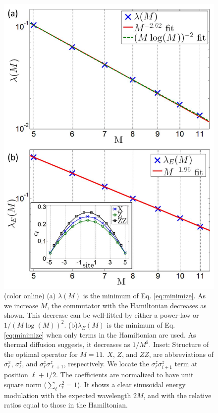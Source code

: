 \documentclass[twocolumn,superscriptaddress, prl,showpacs]{revtex4-1}
\begin{document}
\begin{figure}
\includegraphics[width=0.95\linewidth]{fig_hamiltonian.pdf}
\centering
\caption{(color online) (a) $\lambda(M)$ is the minimum of Eq. \eqref{eq:minimize}.  As we increase $M$, the commutator with the Hamiltonian decreases as shown.
This decrease can be well-fitted by either a power-law or $1/(M\log(M))^2$.
(b)$\lambda_E(M)$ is the minimum of Eq. \eqref{eq:minimize} when only terms in the Hamiltonian are used.  As thermal diffusion suggests, it decreases as $1/M^2$. Inset: Structure of the optimal operator for $M = 11$. $X$, $Z$, and $ZZ$, are
abbreviations of $\sigma^x_\ell$, $\sigma^z_\ell$, and $\sigma^z_\ell \sigma^z_{\ell+1}$, respectively.
We locate the $\sigma^z_\ell \sigma^z_{i+1}$ term at position $\ell+1/2$.  The coefficients are normalized to have unit square norm ($\sum_\ell c_\ell^2 = 1$).
It shows a clear sinusoidal energy modulation with the expected wavelength $2M$, and with the relative ratios equal to those in the Hamiltonian.}
\label{fig:hamiltonian}
\end{figure}
\end{document}
